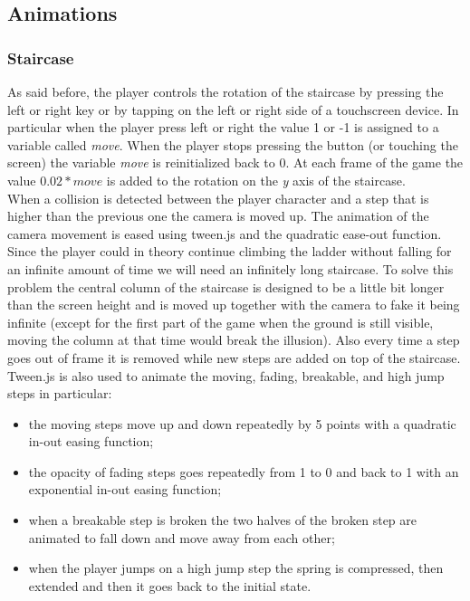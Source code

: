 \documentclass[12pt]{article}
\begin{document}
\subsection{Animations}
\subsubsection{Staircase}
As said before, the player controls the rotation of the staircase by pressing the left or right key or by tapping on the left or right side of a touchscreen device. In particular when the player press left or right the value 1 or -1 is assigned to a variable called \textit{move}. When the player stops pressing the button (or touching the screen) the variable \textit{move} is reinitialized back to 0. At each frame of the game the value \(0.02 * move\) is added to the rotation on the \textit{y} axis of the staircase. \\
When a collision is detected between the player character and a step that is higher than the previous one the camera is moved up. The animation of the camera movement is eased using tween.js and the quadratic ease-out function. Since the player could in theory continue climbing the ladder without falling for an infinite amount of time we will need an infinitely long staircase. To solve this problem the central column of the staircase is designed to be a little bit longer than the screen height and is moved up together with the camera to fake it being infinite (except for the first part of the game when the ground is still visible, moving the column at that time would break the illusion). Also every time a step goes out of frame it is removed while new steps are added on top of the staircase. \\
Tween.js is also used to animate the moving, fading, breakable, and high jump steps in particular:
\begin{itemize}
\item the moving steps move up and down repeatedly by 5 points with a quadratic in-out easing function;
\item the opacity of fading steps goes repeatedly from 1 to 0 and back to 1 with an exponential in-out easing function;
\item when a breakable step is broken the two halves of the broken step are animated to fall down and move away from each other;
\item when the player jumps on a high jump step the spring is compressed, then extended and then it goes back to the initial state.
\end{itemize}
\end{document}
